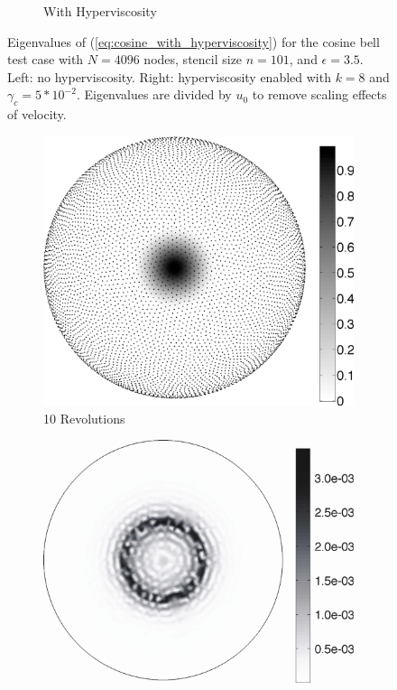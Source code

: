 \documentclass{report}
\begin{document}
\begin{figure}[ht!]
\begin{center}
\begin{subfigure}[b]{0.45\textwidth}
	\caption{With Hyperviscosity}
	\label{fig:cosine_eigs_hv}
\end{subfigure}
\caption{Eigenvalues of (\ref{eq:cosine_with_hyperviscosity}) for the cosine bell test case with $N=4096$ nodes, stencil size $n=101$, and $\epsilon = 3.5$. Left: no hyperviscosity. Right: hyperviscosity enabled with $k=8$ and $\gamma_c = 5*10^{-2}$. Eigenvalues are divided by $u_0$ to remove scaling effects of velocity.  
}
\label{fig:eig_cosine}
\end{center}
\end{figure}

\begin{figure}[ht!]
\begin{center}
\begin{subfigure}[b]{0.45\textwidth}
	\includegraphics[width=1.0\textwidth]{../figures/paper1/figures/cosine_bell/trimmed_ComputedSolution_ManualBar.pdf}
	\caption{10 Revolutions}
	\label{fig:cosine_approx}
\end{subfigure}
\begin{subfigure}[b]{0.45\textwidth}
	\includegraphics[width=1.0\textwidth]{../figures/paper1/figures/cosine_bell/trimmed_Error_CoveredScale2.pdf}

\end{subfigure}
\end{center}
\end{figure}
\end{document}
